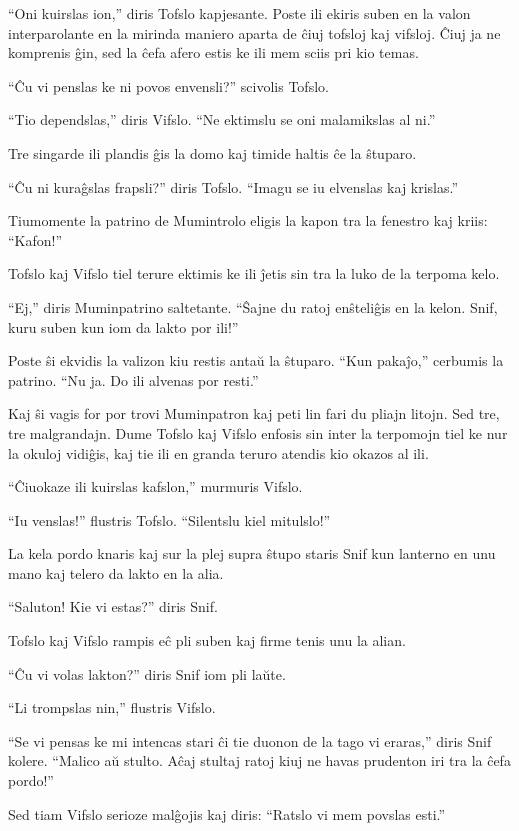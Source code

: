 ``Oni kuirslas ion,'' diris Tofslo kapjesante. Poste ili ekiris suben en la valon interparolante en la mirinda maniero aparta de ĉiuj tofsloj kaj vifsloj. Ĉiuj ja ne komprenis ĝin, sed la ĉefa afero estis ke ili mem sciis pri kio temas.

``Ĉu vi penslas ke ni povos envensli?'' scivolis Tofslo.

``Tio dependslas,'' diris Vifslo. ``Ne ektimslu se oni malamikslas al ni.''

Tre singarde ili plandis ĝis la domo kaj timide haltis ĉe la ŝtuparo.

``Ĉu ni kuraĝslas frapsli?'' diris Tofslo. ``Imagu se iu elvenslas kaj krislas.''

Tiumomente la patrino de Mumintrolo eligis la kapon tra la fenestro kaj kriis: ``Kafon!''

Tofslo kaj Vifslo tiel terure ektimis ke ili ĵetis sin tra la luko de la terpoma kelo.

``Ej,'' diris Muminpatrino saltetante. ``Ŝajne du ratoj enŝteliĝis en la kelon. Snif, kuru suben kun iom da lakto por ili!''

Poste ŝi ekvidis la valizon kiu restis antaŭ la ŝtuparo. ``Kun pakaĵo,'' cerbumis la patrino. ``Nu ja. Do ili alvenas por resti.''

Kaj ŝi vagis for por trovi Muminpatron kaj peti lin fari du pliajn litojn. Sed tre, tre malgrandajn. Dume Tofslo kaj Vifslo enfosis sin inter la terpomojn tiel ke nur la okuloj vidiĝis, kaj tie ili en granda teruro atendis kio okazos al ili.

``Ĉiuokaze ili kuirslas kafslon,'' murmuris Vifslo.

``Iu venslas!'' flustris Tofslo. ``Silentslu kiel mitulslo!''

La kela pordo knaris kaj sur la plej supra ŝtupo staris Snif kun lanterno en unu mano kaj telero da lakto en la alia.

``Saluton! Kie vi estas?'' diris Snif.

Tofslo kaj Vifslo rampis eĉ pli suben kaj firme tenis unu la alian.

``Ĉu vi volas lakton?'' diris Snif iom pli laŭte.

``Li trompslas nin,'' flustris Vifslo.

``Se vi pensas ke mi intencas stari ĉi tie duonon de la tago vi eraras,'' diris Snif kolere. ``Malico aŭ stulto. Aĉaj stultaj ratoj kiuj ne havas prudenton iri tra la ĉefa pordo!''

Sed tiam Vifslo serioze malĝojis kaj diris: ``Ratslo vi mem povslas esti.''

